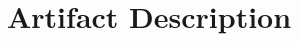 \documentclass[10pt, conference, compsocconf]{IEEEtran}
\begin{document}

\section*{Artifact Description}
\label{sec:AD}



%
\end{document}
